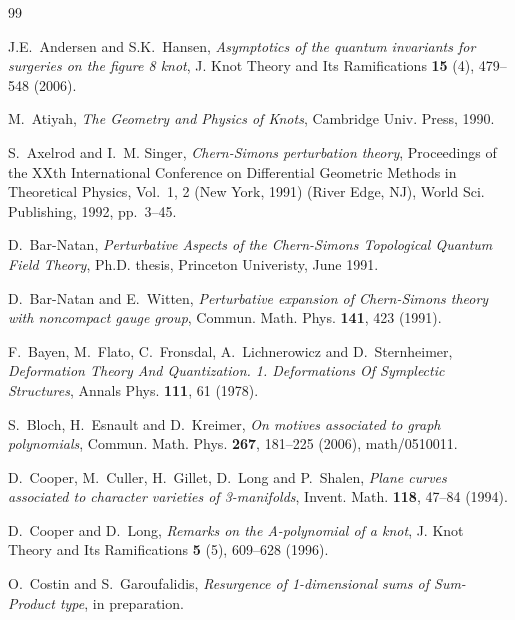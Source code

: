 \documentclass[hyper]{JHEP3}
\begin{document}

\begin{thebibliography}{99}

J.E.~Andersen and S.K.~Hansen, \textsl{Asymptotics of the quantum invariants for surgeries on the figure 8 knot},
\newblock J. Knot Theory and Its Ramifications \textbf{ 15} (4), 479--548 (2006).

M.~Atiyah,
\newblock \textsl{ The Geometry and Physics of Knots},
\newblock Cambridge Univ. Press, 1990.

S.~Axelrod and I.~M. Singer, \textsl{ Chern-{S}imons perturbation theory},
\newblock Proceedings of the XXth International Conference on Differential Geometric
Methods in Theoretical Physics, Vol.\ 1, 2 (New York, 1991) (River Edge, NJ),
World Sci. Publishing, 1992, pp.~3--45.

D.~Bar-Natan,
\textsl{ Perturbative Aspects of the Chern-Simons Topological Quantum Field Theory},
\newblock Ph.D. thesis, Princeton Univeristy, June 1991.

D.~Bar-Natan and E.~Witten,
\textsl{ Perturbative expansion of Chern-Simons theory with noncompact gauge group},
\newblock Commun. Math. Phys. \textbf{ 141}, 423 (1991).

F.~Bayen, M.~Flato, C.~Fronsdal, A.~Lichnerowicz and D.~Sternheimer,
\textsl{ Deformation Theory And Quantization. 1. Deformations Of Symplectic Structures},
\newblock Annals Phys.  \textbf{ 111}, 61 (1978).

S.~Bloch, H.~Esnault and D.~Kreimer,
\textsl{ On motives associated to graph polynomials},
\newblock Commun. Math. Phys. \textbf{ 267}, 181--225 (2006), {math/0510011}.

D.~Cooper, M.~Culler, H.~Gillet, D.~Long and P.~Shalen,
\textsl{ Plane curves associated to character varieties of 3-manifolds},
\newblock Invent. Math. \textbf{ 118}, 47--84 (1994).

D.~Cooper and D.~Long, \textsl{ Remarks on the A-polynomial of a knot},
\newblock J. Knot Theory and Its Ramifications \textbf{ 5} (5), 609--628 (1996).

O.~Costin and S.~Garoufalidis,
\newblock \textsl{ Resurgence of 1-dimensional sums of Sum-Product type}, \newblock in preparation.


\end{thebibliography}
\end{document}

